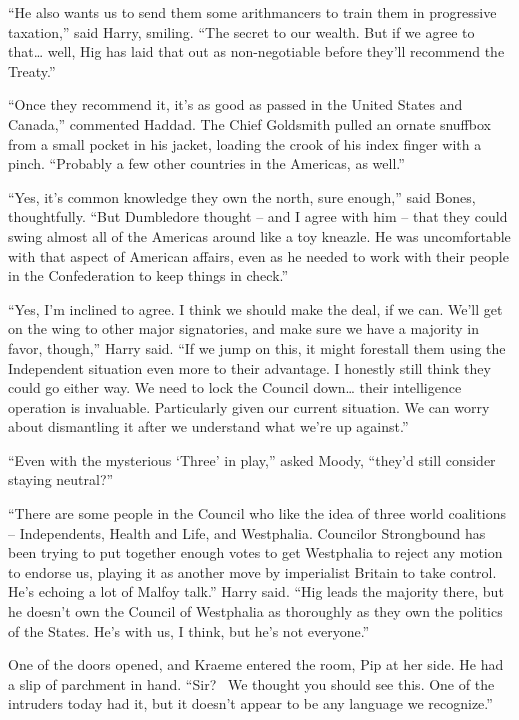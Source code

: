 ``He also wants us to send them some arithmancers to train them in
progressive taxation,'' said Harry, smiling. ``The secret to our wealth.
But if we agree to that\ldots{} well, Hig has laid that out as
non-negotiable before they'll recommend the Treaty.''

``Once they recommend it, it's as good as passed in the United States
and Canada,'' commented Haddad. The Chief Goldsmith pulled an ornate
snuffbox from a small pocket in his jacket, loading the crook of his
index finger with a pinch. ``Probably a few other countries in the
Americas, as well.''

``Yes, it's common knowledge they own the north, sure enough,'' said
Bones, thoughtfully. ``But Dumbledore thought -- and I agree with him --
that they could swing almost all of the Americas around like a toy
kneazle. He was uncomfortable with that aspect of American affairs, even
as he needed to work with their people in the Confederation to keep
things in check.''

``Yes, I'm inclined to agree. I think we should make the deal, if we
can. We'll get on the wing to other major signatories, and make sure we
have a majority in favor, though,'' Harry said. ``If we jump on this, it
might forestall them using the Independent situation even more to their
advantage. I honestly still think they could go either way. We need to
lock the Council down\ldots{} their intelligence operation is
invaluable. Particularly given our current situation. We can worry about
dismantling it after we understand what we're up against.''

``Even with the mysterious `Three' in play,'' asked Moody, ``they'd
still consider staying neutral?''

``There are some people in the Council who like the idea of three world
coalitions -- Independents, Health and Life, and Westphalia. Councilor
Strongbound has been trying to put together enough votes to get
Westphalia to reject any motion to endorse us, playing it as another
move by imperialist Britain to take control. He's echoing a lot of
Malfoy talk.'' Harry said. ``Hig leads the majority there, but he
doesn't own the Council of Westphalia as thoroughly as they own the
politics of the States. He's with us, I think, but he's not everyone.''

One of the doors opened, and Kraeme entered the room, Pip at her side.
He had a slip of parchment in hand. ``Sir? ~We thought you should see
this. One of the intruders today had it, but it doesn't appear to be any
language we recognize.''

